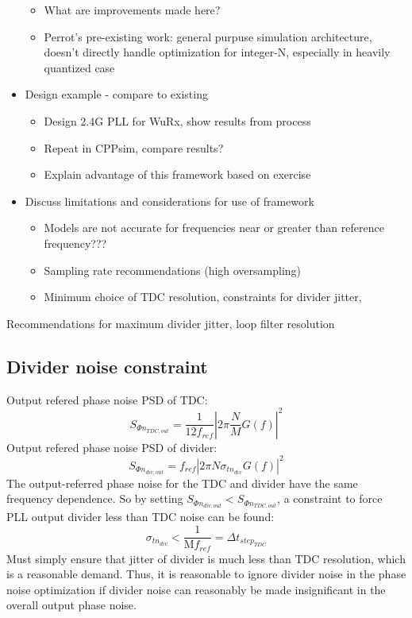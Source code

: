 \begin{itemize}
\begin{itemize}
		\item What are improvements made here?
		\item Perrot's pre-existing work: general purpuse simulation architecture, doesn't directly handle optimization for integer-N, especially in heavily quantized case
	\end{itemize}
	\item Design example - compare to existing
	\begin{itemize}
		\item Design 2.4G PLL for WuRx, show results from process
		\item Repeat in CPPsim, compare results?
		\item Explain advantage of this framework based on exercise
	\end{itemize}
	\item Discuss limitations and considerations for use of framework
	\begin{itemize}
		\item Models are not accurate for frequencies near or greater than reference frequency???
		\item Sampling rate recommendations (high oversampling)
		\item Minimum choice of TDC resolution, constraints for divider jitter,
	\end{itemize}
\end{itemize}

	Recommendations for maximum divider jitter, loop filter resolution
	\subsection{Divider noise constraint}
		Output refered phase noise PSD of TDC:
		\begin{equation}
			S_{\Phi n_{TDC,out}} = \frac{1}{12 f_{ref}}\left|2\pi\frac{N}{M} G(f) \right|^2
		\end{equation}
		Output refered phase noise PSD of divider:
		\begin{equation}
			S_{\Phi n_{div, out}} = f_{ref} \left|2\pi N \sigma_{tn_{div}} G(f)\right|^2
		\end{equation}
		The output-referred phase noise for the TDC and divider have the same frequency dependence. So by setting $S_{\Phi n_{div, out}} < S_{\Phi n_{TDC,out}}$, a constraint to force PLL output divider less than TDC noise can be found:
		\begin{equation}
			\sigma_{tn_{div}} < \frac{1}{\mathrm{M}f_{ref}} = \Delta t_{step_{TDC}}
		\end{equation}
		Must simply ensure that jitter of divider is much less than TDC resolution, which is a reasonable demand. Thus, it is reasonable to ignore divider noise in the phase noise optimization if divider noise can reasonably be made insignificant in the overall output phase noise.

